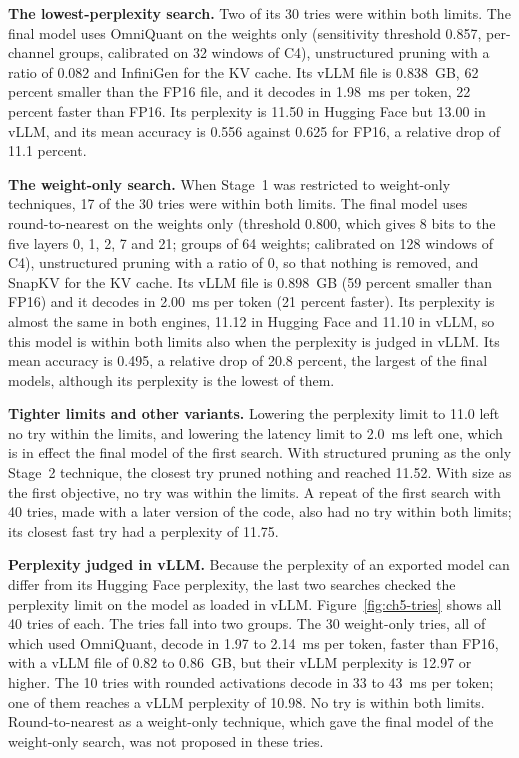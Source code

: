 \textbf{The lowest-perplexity search.} Two of its 30 tries were within both limits. The final model uses OmniQuant on the weights only (sensitivity threshold 0.857, per-channel groups, calibrated on 32 windows of C4), unstructured pruning with a ratio of 0.082 and InfiniGen for the KV cache. Its vLLM file is 0.838~GB, 62 percent smaller than the FP16 file, and it decodes in 1.98~ms per token, 22 percent faster than FP16. Its perplexity is 11.50 in Hugging Face but 13.00 in vLLM, and its mean accuracy is 0.556 against 0.625 for FP16, a relative drop of 11.1 percent.

\textbf{The weight-only search.} When Stage~1 was restricted to weight-only techniques, 17 of the 30 tries were within both limits. The final model uses round-to-nearest on the weights only (threshold 0.800, which gives 8 bits to the five layers 0, 1, 2, 7 and 21; groups of 64 weights; calibrated on 128 windows of C4), unstructured pruning with a ratio of 0, so that nothing is removed, and SnapKV for the KV cache. Its vLLM file is 0.898~GB (59 percent smaller than FP16) and it decodes in 2.00~ms per token (21 percent faster). Its perplexity is almost the same in both engines, 11.12 in Hugging Face and 11.10 in vLLM, so this model is within both limits also when the perplexity is judged in vLLM. Its mean accuracy is 0.495, a relative drop of 20.8 percent, the largest of the final models, although its perplexity is the lowest of them.

\textbf{Tighter limits and other variants.} Lowering the perplexity limit to 11.0 left no try within the limits, and lowering the latency limit to 2.0~ms left one, which is in effect the final model of the first search. With structured pruning as the only Stage~2 technique, the closest try pruned nothing and reached 11.52. With size as the first objective, no try was within the limits. A repeat of the first search with 40 tries, made with a later version of the code, also had no try within both limits; its closest fast try had a perplexity of 11.75.

\textbf{Perplexity judged in vLLM.} Because the perplexity of an exported model can differ from its Hugging Face perplexity, the last two searches checked the perplexity limit on the model as loaded in vLLM. Figure~\ref{fig:ch5-tries} shows all 40 tries of each. The tries fall into two groups. The 30 weight-only tries, all of which used OmniQuant, decode in 1.97 to 2.14~ms per token, faster than FP16, with a vLLM file of 0.82 to 0.86~GB, but their vLLM perplexity is 12.97 or higher. The 10 tries with rounded activations decode in 33 to 43~ms per token; one of them reaches a vLLM perplexity of 10.98. No try is within both limits. Round-to-nearest as a weight-only technique, which gave the final model of the weight-only search, was not proposed in these tries.

